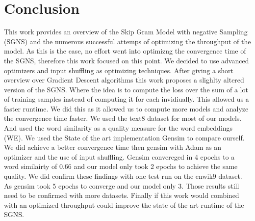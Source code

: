 \chapter{Conclusion}\label{chap:conclusion}

This work provides an overview of the Skip Gram Model with negative Sampling (SGNS) and the numerous successful attemps of optimizing the throughput of the model. As this is the case, no effort went into optimizng the convergence time of the SGNS, therefore this work focused on this point. We decided to use advanced optimizers and input shuffling as optimizing techniques. After giving a short overview over Gradient Descent algorithms this work proposes a slighlty altered version of the SGNS. Where the idea is to compute the loss over the sum of a lot of training samples instead of computing it for each invidiually. This allowed us a faster runtime. We did this as it allowed us to compute more models and analyze the convergence time faster. We used the text8 dataset for most of our models. And used the word similarity  as a quality measure for the word embeddings (WE). We used the State of the art implementation Gensim to compare ourself. We did achieve a better convergence time then gensim with Adam as an optimizer and the use of input shuffling. Gensim convereged in 4 epochs to a word similairty of 0.66 and our model only took 2 epochs to achieve the same quality. We did confirm these findings with one test run on the enwik9 dataset. As gensim took 5 epochs to converge and our model only 3.  Those results still need to be confirmed with more datasets. Finally if this work would combined with an optimized throughput could improve the state of the art runtime of the SGNS. 